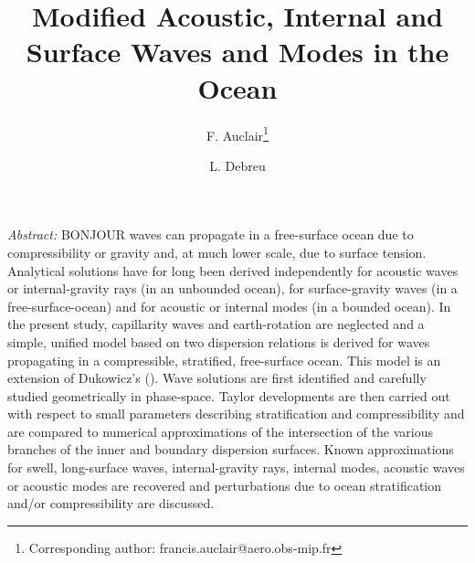 \documentclass[a4paper,11pt]{article}
\title{Modified Acoustic, Internal and Surface Waves and Modes in the Ocean}
\author[1]{F. Auclair\thanks{Corresponding author: francis.auclair@aero.obs-mip.fr}}
\author[2]{L. Debreu}
\affil[1]{Laboratoire d'A\'erologie, Universit\'e de Toulouse, CNRS, UPS, France}
\affil[2]{Univ. Grenoble Alpes, Inria, CNRS, Grenoble INP, LJK, 38000 Grenoble, France}
\begin{document}
%

\renewcommand{\thepage}{}
\hypersetup{pdfborder=0 0 0}
\maketitle
\setcounter{tocdepth}{2}

\let\oldref\ref
\renewcommand{\ref}[1]{(\oldref{#1})}


\textit{Abstract:} BONJOUR waves can propagate in a free-surface ocean due to compressibility or gravity and, at much lower scale, due to surface tension. Analytical solutions have for long been derived independently for acoustic waves or internal-gravity rays (in an unbounded ocean), for surface-gravity waves (in a free-surface-ocean) and for acoustic or internal modes (in a bounded ocean). In the present study, capillarity waves and earth-rotation are neglected and a simple, unified model based on two dispersion relations is derived for waves propagating in a compressible, stratified, free-surface ocean. This model is an extension of Dukowicz's (\cite{dukowicz_2013}). Wave solutions are first identified and carefully studied geometrically in phase-space. Taylor developments are then carried out with respect to small parameters describing stratification and compressibility and are compared to numerical approximations of the intersection of the various branches of the inner and boundary dispersion surfaces. Known approximations for swell, long-surface waves, internal-gravity rays, internal modes, acoustic waves or acoustic modes are recovered and perturbations due to ocean stratification and/or compressibility are discussed.\\

\newpage
\renewcommand{\thepage}{\arabic{page}}
\setcounter{page}{1}
\end{document}
